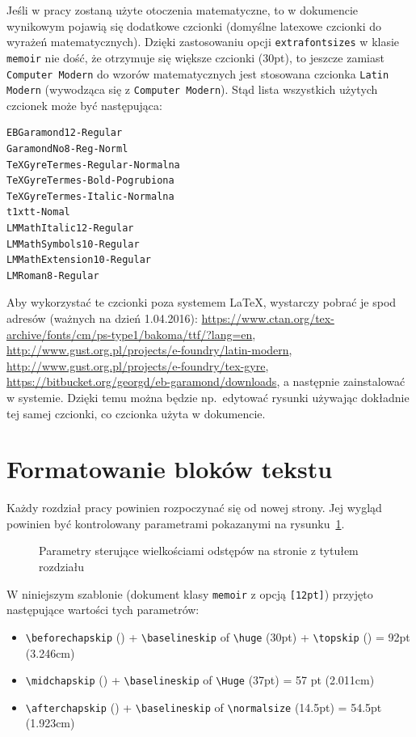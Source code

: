 Jeśli w pracy zostaną użyte otoczenia matematyczne, to w dokumencie wynikowym pojawią się dodatkowe czcionki (domyślne latexowe czcionki do wyrażeń matematycznych). Dzięki zastosowaniu opcji \texttt{extrafontsizes} w klasie \texttt{memoir} nie dość, że otrzymuje się większe czcionki (30pt), to jeszcze zamiast \texttt{Computer Modern} do wzorów matematycznych jest stosowana czcionka \texttt{Latin Modern} (wywodząca się z \texttt{Computer Modern}).
Stąd lista wszystkich użytych czcionek może być następująca:
\begin{lstlisting}[basicstyle=\footnotesize\ttfamily]
EBGaramond12-Regular
GaramondNo8-Reg-Norml
TeXGyreTermes-Regular-Normalna
TeXGyreTermes-Bold-Pogrubiona
TeXGyreTermes-Italic-Normalna
t1xtt-Nomal
LMMathItalic12-Regular
LMMathSymbols10-Regular
LMMathExtension10-Regular
LMRoman8-Regular
\end{lstlisting}

Aby wykorzystać te czcionki poza systemem LaTeX, wystarczy pobrać je spod adresów (ważnych na dzień
1.04.2016):
\url{https://www.ctan.org/tex-archive/fonts/cm/ps-type1/bakoma/ttf/?lang=en}, \url{http://www.gust.org.pl/projects/e-foundry/latin-modern}, \url{http://www.gust.org.pl/projects/e-foundry/tex-gyre}, \url{https://bitbucket.org/georgd/eb-garamond/downloads},
a następnie zainstalować w systemie. Dzięki temu można będzie np.~edytować rysunki używając dokładnie tej samej czcionki, co czcionka użyta w dokumencie.

\section{Formatowanie bloków tekstu}
Każdy rozdział pracy powinien rozpoczynać się od nowej strony. Jej wygląd powinien być kontrolowany parametrami pokazanymi na rysunku~\ref{fig:LayChap}.
\begin{figure}[t]
	\centering
	\chapterdiagram
	\caption{Parametry sterujące wielkościami odstępów na stronie z tytułem rozdziału}
	\label{fig:LayChap}
\end{figure}
W niniejszym szablonie (dokument klasy \texttt{memoir} z opcją \texttt{[12pt]}) przyjęto następujące wartości tych parametrów:
\begin{itemize}
	\item \verb?\beforechapskip? (\printlength{\beforechapskip}) + \verb?\baselineskip? of \verb+\huge+ (30pt) + \verb+\topskip+ (\printlength{\topskip}) = 92pt (3.246cm)
	\item \verb?\midchapskip? (\printlength{\midchapskip}) + \verb?\baselineskip? of \verb+\Huge+ (37pt) = 57 pt (2.011cm)
	\item \verb?\afterchapskip? (\printlength{\afterchapskip}) + \verb+\baselineskip+ of \verb+\normalsize+ (14.5pt) = 54.5pt (1.923cm)
\end{itemize}

